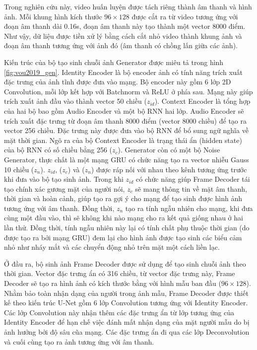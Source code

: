 Trong nghiên cứu này, video huấn luyện được tách riêng thành âm thanh và hình ảnh. Mỗi khung hình kích thước $96\times128$ được cắt ra từ video tương ứng với đoạn âm thanh dài 0.16s, đoạn âm thanh này tạo thành một vector 8000 điểm. Như vậy, dữ liệu được tiền xử lý bằng cách cắt nhỏ video thành khung ảnh và đoạn âm thanh tương ứng với ảnh đó (âm thanh có chồng lấn giữa các ảnh).

Kiến trúc của bộ tạo sinh chuỗi ảnh Generator được miêu tả trong hình \ref{fig:vou2019_gen}. Identity Encoder là bộ encoder ảnh có tính năng trích xuất đặc trưng của ảnh tĩnh được đưa vào mạng. Bộ encoder này gồm 6 lớp 2D Convolution, mỗi lớp kết hợp với Batchnorm và ReLU ở phía sau. Mạng này giúp trích xuất ảnh đầu vào thành vector 50 chiều ($z_{id}$). Context Encoder là tổng hợp của hai bộ bao gồm Audio Encoder và một bộ RNN hai lớp. Audio Encoder sẽ trích xuất đặc trưng từ đoạn âm thanh 8000 điểm (vector 8000 chiều) để tạo ra vector 256 chiều. Đặc trưng này được đưa vào bộ RNN để bổ sung ngữ nghĩa về mặt thời gian. Ngõ ra của bộ Context Encoder là trạng thái ẩn (hidden state) của bộ RNN có số chiều bằng 256 ($z_c$). Generator còn có một bộ Noise Generator, thực chất là một mạng GRU có chức năng tạo ra vector nhiễu Gauss 10 chiều ($z_n$). $z_{id}$, ($z_c$) và ($z_n$) được ráp nối với nhau theo kênh tương ứng trước khi đưa vào bộ tạo sinh ảnh. Trong khi $z_{id}$ có chức năng giúp Frame Decoder tái tạo chính xác gương mặt của người nói, $z_c$ sẽ mang thông tin về mặt âm thanh, thời gian và hoàn cảnh, giúp tạo ra gợi ý cho mạng để tạo sinh được hình ảnh tương ứng với âm thanh. Đồng thời, $z_n$ tạo ra tính ngẫu nhiên cho mạng, khi đưa cùng một đầu vào, thì sẽ không khi nào mạng cho ra kết quả giống nhau ở hai lần thử. Đồng thời, tính ngẫu nhiên này lại có tính chất phụ thuộc thời gian (do được tạo ra bởi mạng GRU) đem lại cho hình ảnh được tạo sinh các biểu cảm nhỏ như nháy mắt và các chuyển động nhỏ trên mặt một cách liền lạc.

Ở đầu ra, bộ sinh ảnh Frame Decoder được sử dụng để tạo sinh chuỗi ảnh theo thời gian. Vector đặc trưng ẩn có 316 chiều, từ vector đặc trưng này, Frame Decoder sẽ tạo ra hình ảnh có kích thước bằng với hình mẫu ban đầu ($96\times128$). Nhằm bảo toàn nhận dạng của người trong ảnh mẫu, Frame Decoder được thiết kế theo kiến trúc U-Net gồm 6 lớp Convolution tương ứng với Identity Encoder. Các lớp Convolution này nhận thêm các đặc trưng ẩn từ lớp tương ứng của Identity Encoder để hạn chế việc đánh mất nhận dạng của mặt người mẫu do bị ảnh hưởng bởi độ sâu cũa mạng. Các đặc trưng ẩn đi qua các lớp Deconvolution và cuối cùng tạo ra ảnh tương ứng với âm thanh.

